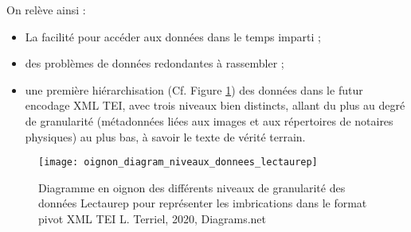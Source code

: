 On relève ainsi : 
\begin{itemize}
    \item La facilité pour accéder aux données dans le temps imparti ;
    \item des problèmes de données redondantes à rassembler ;
    \item une première hiérarchisation (Cf. Figure \ref{fig:oignon_diagram_niveaux_donnees_lectaurep}) des données dans le futur encodage XML TEI, avec trois niveaux bien distincts, allant du plus au degré de granularité (métadonnées liées aux images et aux répertoires de notaires physiques) au plus bas, à savoir le texte de vérité terrain.
\end{itemize}
\begin{figure}
    \centering
    \centerline{\texttt{[image: oignon\_diagram\_niveaux\_donnees\_lectaurep]}}
    \caption{Diagramme en oignon des différents niveaux de granularité des données Lectaurep pour représenter les imbrications dans le format pivot XML TEI \textcopyright L. Terriel, 2020, Diagrams.net}
    \label{fig:oignon_diagram_niveaux_donnees_lectaurep}
\end{figure}
\newpage
